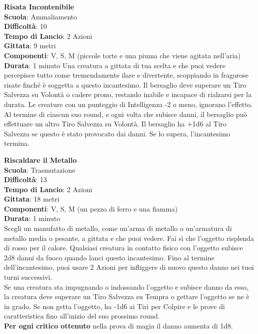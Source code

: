 \begin{multicols}{2}
\medskip\textbf{Risata Incontenibile}\\
\textbf{Scuola}: Ammaliamento\\
\textbf{Difficoltà}:  10\\
\textbf{Tempo di Lancio}: 2 Azioni\\
\textbf{Gittata}: 9 metri\\
\textbf{Componenti}: V, S, M (piccole torte e una piuma che viene agitata nell'aria)\\
\textbf{Durata}: 1 minuto 
Una creatura a gittata di tua scelta e che puoi vedere percepisce tutto come tremendamente ilare e divertente, scoppiando in fragorose risate finché è soggetta a questo incantesimo. Il bersaglio deve superare un Tiro Salvezza su Volontà o cadere prono, restando inabile e incapace di rialzarsi per la durata. Le creature con un punteggio di Intelligenza -2 o meno, ignorano l’effetto.\\
Al termine di ciascun suo round, e ogni volta che subisce danni, il bersaglio può effettuare un altro Tiro Salvezza su Volontà. Il bersaglio ha +1d6 al Tiro Salvezza se questo è stato provocato dai danni. Se lo supera, l'incantesimo termina.

\medskip\textbf{Riscaldare il Metallo}\\
\textbf{Scuola}: Trasmutazione\\
\textbf{Difficoltà}:  13\\
\textbf{Tempo di Lancio}: 2 Azioni\\
\textbf{Gittata}: 18 metri\\
\textbf{Componenti}: V, S, M (un pezzo di ferro e una fiamma)\\
\textbf{Durata}: 1 minuto\\
Scegli un manufatto di metallo, come un'arma di metallo o un'armatura di metallo media o pesante, a gittata e che puoi vedere. Fai sì che l’oggetto risplenda di rosso per il calore. Qualsiasi creatura in contatto fisico con l’oggetto subisce 2d8 danni da fuoco quando lanci questo incantesimo. Fino al termine dell'incantesimo, puoi usare 2 Azioni per infliggere di nuovo questo danno nei tuoi turni successivi.\\
Se una creatura sta impugnando o indossando l’oggetto e subisce danno da esso, la creatura deve superare un Tiro Salvezza su Tempra o gettare l’oggetto se ne è in grado. Se non getta l’oggetto, ha -1d6 ai Tiri per Colpire e le prove di caratteristica fino all'inizio del suo prossimo round.\\
\textbf{Per ogni critico ottenuto} nella prova di magia il danno aumenta di 1d8.


\end{multicols}
